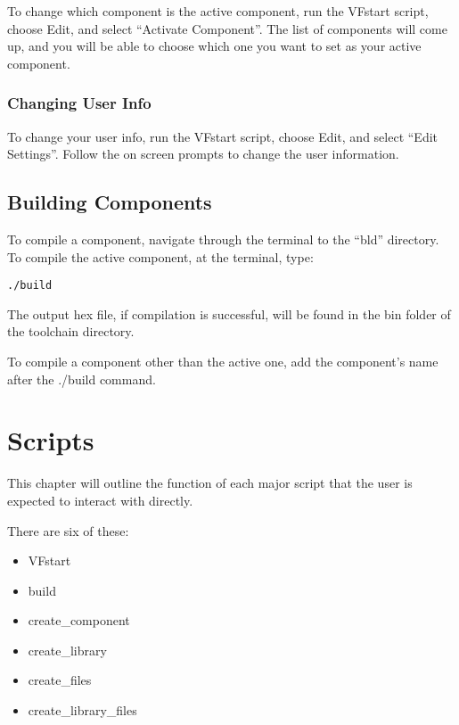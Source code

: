 \documentclass[a4paper, oneside, 11pt, titlepage, onecolumn, openright]{report}
\begin{document}
					To change which component is the active component, run the VFstart script, choose Edit, and select ``Activate Component''. The list of components will come up, and you will be able to choose which one you want to set as your active component.

				\subsection{Changing User Info}
					\label{Changing the Active component:Changing User Info} 
			
					To change your user info, run the VFstart script, choose Edit, and select ``Edit Settings''. Follow the on screen prompts to change the user information.

			\section{Building Components}
				\label{s:Getting Started:Building Components}

				To compile a component, navigate through the terminal to the ``bld'' directory. To compile the active component, at the terminal, type:

				\begin{lstlisting}
./build
				\end{lstlisting}

The output hex file, if compilation is successful, will be found in the bin folder of the toolchain directory.

To compile a component other than the active one, add the component's name after the ./build command. 
			
		\chapter{Scripts}
			\label{c:Scripts}
		
			This chapter will outline the function of each major script that the user is expected to interact with directly.
		
There are six of these:
			
			\begin{itemize}
		
				\item VFstart

				\item build

				\item create\_component

				\item create\_library

				\item create\_files

				\item create\_library\_files
		
			\end{itemize} 
	
\end{document}
